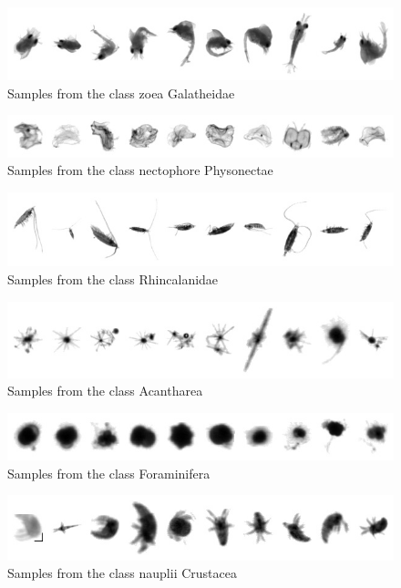 \begin{figure}[h]
\includegraphics[width=\columnwidth]{collage/011_zoea__Galatheidae.jpg}\caption{Samples from the class zoea  Galatheidae }
\end{figure}
\begin{figure}[h]
\includegraphics[width=\columnwidth]{collage/012_nectophore__Physonectae.jpg}\caption{Samples from the class nectophore  Physonectae }
\end{figure}
\begin{figure}[h]
\includegraphics[width=\columnwidth]{collage/013_Rhincalanidae.jpg}\caption{Samples from the class Rhincalanidae }
\end{figure}
\begin{figure}[h]
\includegraphics[width=\columnwidth]{collage/014_Acantharea.jpg}\caption{Samples from the class Acantharea }
\end{figure}
\begin{figure}[h]
\includegraphics[width=\columnwidth]{collage/015_Foraminifera.jpg}\caption{Samples from the class Foraminifera }
\end{figure}
\begin{figure}[h]
\includegraphics[width=\columnwidth]{collage/016_nauplii__Crustacea.jpg}\caption{Samples from the class nauplii  Crustacea }
\end{figure}

